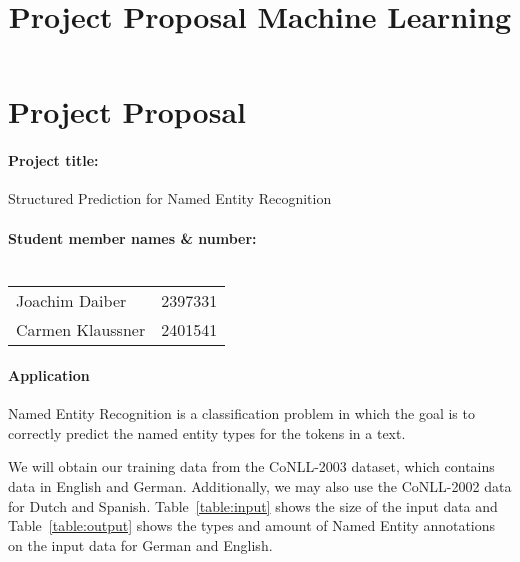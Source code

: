 \documentclass[a4paper,10pt]{article}
\title{Project Proposal Machine Learning}
\author{}
\date{}
\begin{document}
\maketitle

% 
% 


\section*{Project Proposal}

\paragraph{Project title:}
Structured Prediction for Named Entity Recognition

\paragraph{Student member names \& number:\\\\}

\begin{tabular}{l l}
Joachim Daiber   & 2397331 \\
Carmen Klaussner & 2401541\\
\end{tabular}



\paragraph{Application}

Named Entity Recognition is a classification problem in which the goal is to correctly predict the named entity types for
the tokens in a text.


We will obtain our training data from the CoNLL-2003\cite{TjongKimSang:2003:ICS:1119176.1119195} dataset, which contains
data in English and German. Additionally, we may also use the CoNLL-2002 data for Dutch and Spanish.  Table~\ref{table:input} shows the size of the input data and Table~\ref{table:output} shows the types and amount of Named Entity annotations on the input data for German and English.
\end{document}
